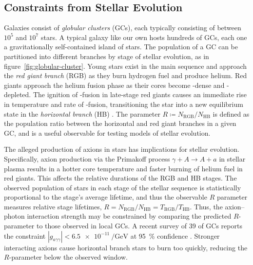 \subsection{Constraints from Stellar Evolution}


Galaxies consist of \emph{globular clusters} (GCs), each typically consisting of between $10^5$ and $10^7$ stars.
A typical galaxy like our own hosts hundreds of GCs, each one a gravitationally self-contained island of stars.
The population of a GC can be partitioned into different branches by stage of stellar evolution, as in figure~\ref{fig:globular-cluster}.
Young stars exist in the main sequence and approach the \emph{red giant branch} (RGB) as they burn hydrogen fuel and produce helium.
Red giants approach the helium fusion phase as their cores become -dense and -depleted.
The ignition of -fusion in late-stage red giants causes an immediate rise in temperature and rate of -fusion, transitioning the star into a new equilibrium state in the \emph{horizontal branch} (HB) \cite[§\,3.2]{Irastorza_2018}.
The parameter $R \coloneqq N_\text{RGB}/N_\text{HB}$ is defined as the population ratio between the horizontal and red giant branches in a given GC, and is a useful observable for testing models of stellar evolution.

The alleged production of axions in stars has implications for stellar evolution.
Specifically, axion production via the Primakoff process $γ + A \to A + a$ in stellar plasma results in a hotter core temperature and faster burning of helium fuel in red giants.
This affects the relative durations of the RGB and HB stages.
The observed population of stars in each stage of the stellar sequence is statistically proportional to the stage's average lifetime, and thus the observable $R$ parameter measures relative stage lifetimes, $R = N_\text{RGB}/N_\text{HB} = T_\text{RGB}/T_\text{HB}$.
Thus, the axion--photon interaction strength may be constrained by comparing the predicted $R$-parameter to those observed in local GCs.
A recent survey \cite{Stellar-evolution-constraints_2015,Stellar-evolution-constraints_2020} of 39 of GCs reports the constraint $|g_{aγγ}| < \SI{6.5e-11}{\per\giga\eV}$ at \SI{95}{\percent} confidence \cite[§\,3.2]{Irastorza_2018}.
Stronger interacting axions cause horizontal branch stars to burn too quickly, reducing the $R$-parameter below the observed window.


